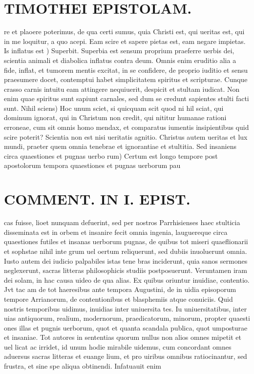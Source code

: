 \documentclass{article}
\begin{document}
\begin{pages}
\section*{TIMOTHEI EPISTOLAM. }
\marginpar{[ p.157 ]}\pstart re et plaoere poterimus, de qua certi sumus, quia Christi est, qui ueritas est, qui in me loquitur, a quo acepi. Eam scire et sapere pietas est, eam negare impietas.  \pend\pstart Is inflatus est ) Superbit. Superbia est sensum proprium praeferre uerbis dei, scientia animali et diabolica inflatus contra deum. Omnis enim eruditio alia a fide, inflat, et tumorem mentis excitat, in se confidere, de proprio iuditio et sensu praesumere docet, contemptui habet simplicitatem spiritus et scripturae. Cunque crasso carnis intuitu eam attingere nequiuerit, despicit et stultam iudicat. Non enim quae spiritus sunt sapiunt carnales, sed dum se credunt sapientes stulti facti sunt.  \pend\pstart Nihil sciens) Hoc unum sciet, si quicquam scit quod ni hil sciat, qui dominum ignorat, qui in Christum non credit, qui nititur humanae rationi erroneae, cum sit omnis homo mendax, et comparatus iumentis insipientibus quid scire poterit? Scientia non est nisi ueritatis agnitio. Christus autem ueritas et lux mundi, praeter quem omnia tenebrae et ignorantiae et stultitia.  \pend\pstart Sed insaniens circa quaestiones et pugnas uerbo rum) Certum est longo tempore post apostolorum tempora quaestiones et pugnas uerborum pau\pend
\section*{COMMENT. IN I. EPIST. }
\marginpar{[ p.158 ]}\pstart cas fuisse, lioet nunquam defuerint, sed per nostros Parrhisienses haec stulticia disseminata est in orbem et insanire fecit omnia ingenia, lauguereque circa quaestiones futiles et insanas uerborum pugnas, de quibus tot miseri quaeflionarii et sophstae nihil inte grum uel oertum reliquerunt, sed dubiis inuoluerunt omnia. Iusto autem dei iudicio palpabiles istas tene bras inciderunt, quia sanos sermones neglexerunt, sacras litteras philosophicis studiis postposuerunt. Veruntamen iram dei solam, in hac causa uideo de qua alias.  \pend\pstart Ex quibus oriuntur inuidiae, contentio. Jvt tac am de tot haeresibus ante tempora Augustini, de in uidia episoporum tempore Arrianorum, de contentionibus et blasphemiis atque conuiciis. Quid nostris temporibus uidimus, inuidias inter uniuersita tes. Iu uniuersitatibus, inter uias antiquorum, realium, modernorum, praedicatorum, minorum, propter quaesti ones illas et pugnis uerborum, quot et quanta scandala publica, quot umposturae et insaniae. Tot autores in sententias quorum nullus non alios omnes mipetit et uel licat ac irridet, id unum hodie mirabile uidemus, cum concordant omnes aduersus sacras litteras et euange lium, et pro uiribus omnibus ratiocinantur, sed frustra, et sine spe aliqua obtinendi. Infatuauit enim  \pend

\end{pages}
\end{document}
